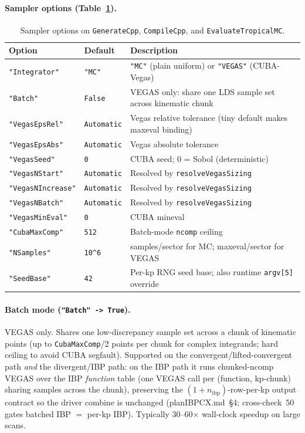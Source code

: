 \documentclass[11pt,a4paper]{article}
\begin{document}
\paragraph{Sampler options (Table~\ref{tab:sampler}).}
\begin{table}[htbp]
\centering
\begin{tabular}{lll}
\toprule
\textbf{Option} & \textbf{Default} & \textbf{Description} \\
\midrule
\texttt{"Integrator"} & \texttt{"MC"} & \texttt{"MC"} (plain uniform) or \texttt{"VEGAS"} (CUBA-Vegas) \\
\texttt{"Batch"} & \texttt{False} & VEGAS only: share one LDS sample set across kinematic chunk \\
\texttt{"VegasEpsRel"} & \texttt{Automatic} & Vegas relative tolerance (tiny default makes maxeval binding) \\
\texttt{"VegasEpsAbs"} & \texttt{Automatic} & Vegas absolute tolerance \\
\texttt{"VegasSeed"} & \texttt{0} & CUBA seed; 0 = Sobol (deterministic) \\
\texttt{"VegasNStart"} & \texttt{Automatic} & Resolved by \texttt{resolveVegasSizing} \\
\texttt{"VegasNIncrease"} & \texttt{Automatic} & Resolved by \texttt{resolveVegasSizing} \\
\texttt{"VegasNBatch"} & \texttt{Automatic} & Resolved by \texttt{resolveVegasSizing} \\
\texttt{"VegasMinEval"} & \texttt{0} & CUBA mineval \\
\texttt{"CubaMaxComp"} & \texttt{512} & Batch-mode \texttt{ncomp} ceiling \\
\texttt{"NSamples"} & \texttt{10\textasciicircum{}6} & samples/sector for MC; maxeval/sector for VEGAS \\
\texttt{"SeedBase"} & \texttt{42} & Per-kp RNG seed base; also runtime \texttt{argv[5]} override \\
\bottomrule
\end{tabular}
\caption{Sampler options on \texttt{GenerateCpp}, \texttt{CompileCpp}, and \texttt{EvaluateTropicalMC}.}
\label{tab:sampler}
\end{table}

\paragraph{Batch mode (\texttt{"Batch" -> True}).} VEGAS only. Shares one low-discrepancy sample set across a chunk of kinematic points (up to \texttt{CubaMaxComp}/2 points per chunk for complex integrands; hard ceiling to avoid CUBA segfault). Supported on the convergent/lifted-convergent path \emph{and} the divergent/IBP path: on the IBP path it runs chunked-ncomp VEGAS over the IBP \emph{function} table (one VEGAS call per (function, kp-chunk) sharing samples across the chunk), preserving the $(1+n_{\mathrm{ibp}})$-row-per-kp output contract so the driver combine is unchanged (planIBPCX.md~\S4; cross-check~50 gates batched IBP $=$ per-kp IBP). Typically 30--60$\times$ wall-clock speedup on large scans.
\end{document}
